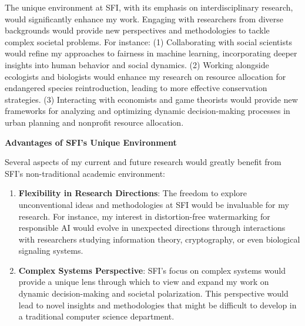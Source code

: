 \documentclass[11pt]{article}
\begin{document}
{The unique environment at SFI, with its emphasis on interdisciplinary research, would significantly enhance my work. Engaging with researchers from diverse backgrounds would provide new perspectives and methodologies to tackle complex societal problems. For instance:
(1) Collaborating with social scientists would refine my approaches to fairness in machine learning, incorporating deeper insights into human behavior and social dynamics.
(2) Working alongside ecologists and biologists would enhance my research on resource allocation for endangered species reintroduction, leading to more effective conservation strategies.
(3) Interacting with economists and game theorists would provide new frameworks for analyzing and optimizing dynamic decision-making processes in urban planning and nonprofit resource allocation.
%

\textbf{Advantages of SFI's Unique Environment}

Several aspects of my current and future research would greatly benefit from SFI's non-traditional academic environment:

\begin{enumerate}[leftmargin=*]
    \item \textbf{Flexibility in Research Directions}: The freedom to explore unconventional ideas and methodologies at SFI would be invaluable for my research. For instance, my interest in distortion-free watermarking for responsible AI would evolve in unexpected directions through interactions with researchers studying information theory, cryptography, or even biological signaling systems.
    \item \textbf{Complex Systems Perspective}: SFI's focus on complex systems would provide a unique lens through which to view and expand my work on dynamic decision-making and societal polarization. This perspective would lead to novel insights and methodologies that might be difficult to develop in a traditional computer science department.
\end{enumerate}

}
\end{document}
